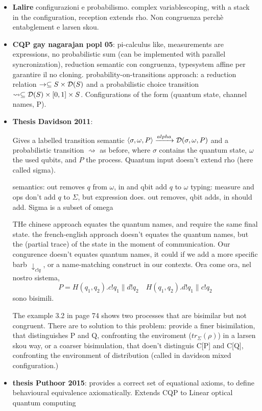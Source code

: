 \begin{itemize}
\item \textbf{Lalire} configurazioni e probabilismo. complex variablescoping, with a stack in the configuration, reception extends rho. Non congruenza perchè entabglement e larsen skou.


\item \textbf{CQP gay nagarajan popl 05}: pi-calculus like, measurements are expressions, no probabilistic sum (can be implemented with parallel syncronization), reduction semantic con congruenza, typesystem affine per garantire il no cloning. probability-on-transitions approach: a reduction relation $\rightarrow \subseteq S \times \mathcal{D}(S)$ and a probabilistic choice transition $\rightsquigarrow \subseteq \mathcal{D}(S)\times [0, 1] \times S$. Configurations of the form (quantum state, channel names, P).

\item \textbf{Thesis Davidson 2011}:

Gives a labelled transition semantic $\langle \sigma, \omega, P\rangle \xrightarrow{alpha} \mathcal{D}(\sigma, \omega, P)$ and a probabilistic transition  $\rightsquigarrow$ as before, where $\sigma$ contains the quantum state, $\omega$ the used qubits, and $P$ the process. Quantum input doesn't extend rho (here called sigma).

semantics: out removes $q$ from $\omega$, in and qbit add $q$ to $\omega$ 
typing: measure and ops don't add $q$ to $\Sigma$, but expression does. out removes, qbit adds, in should add. 
Sigma is a subset of omega

THe chinese approach equates the quantum names, and require the same final state.
the french-english approach doesn't equates the quantum names, but the (partial trace) of the state in the moment of communication.
Our congurence doesn't equates quantum names, it could if we add a more specific barb $\downarrow_{c!q}$, or a name-matching construct in our contexts. 
Ora come ora, nel nostro sistema, 
\[ P = H(q_1, q_2).c!q_1 \parallel d!q_2 \quad H(q_1, q_2).d!q_1 \parallel c!q_2\]
sono bisimili.

The example 3.2 in page 74 shows two processes that are bisimilar but not congruent. There are to solution to this problem: provide a finer bisimilation, that distinguishes P and Q, confronting the enviroment ($tr_\Sigma(\rho)$) in a larsen skou way, or a coarser bisimulation, that doen't distinguis C[P] and C[Q], confronting the environment of distribution (called in davidson mixed configuration.)


\item \textbf{thesis Puthoor 2015}:
provides a correct set of equational axioms, to define behavioural equivalence axiomatically. Extends CQP to Linear optical quantum computing
\end{itemize}


